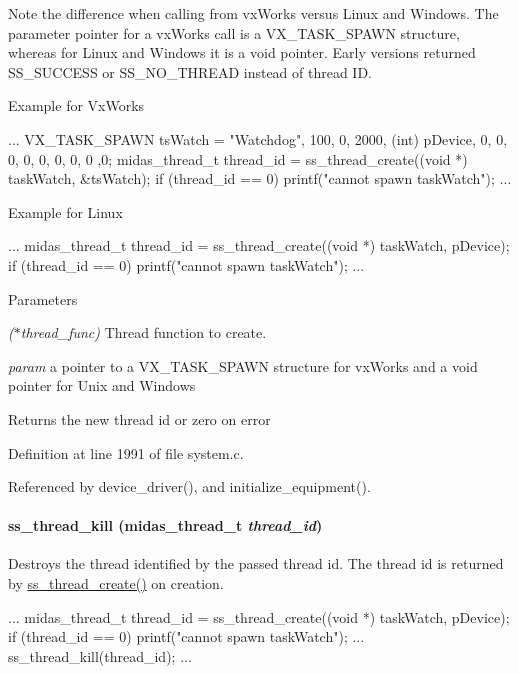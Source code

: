 Note the difference when calling from vxWorks versus Linux and Windows. The parameter pointer for a vxWorks call is a VX\_\-TASK\_\-SPAWN structure, whereas for Linux and Windows it is a void pointer. Early versions returned SS\_\-SUCCESS or SS\_\-NO\_\-THREAD instead of thread ID.

Example for VxWorks 
\begin{DoxyCode}
...
VX_TASK_SPAWN tsWatch = {"Watchdog", 100, 0, 2000,  (int) pDevice, 0, 0, 0, 0, 0,
       0, 0, 0 ,0};
midas_thread_t thread_id = ss_thread_create((void *) taskWatch, &tsWatch);
if (thread_id == 0) {
  printf("cannot spawn taskWatch\n");
}
...
\end{DoxyCode}
 Example for Linux 
\begin{DoxyCode}
...
midas_thread_t thread_id = ss_thread_create((void *) taskWatch, pDevice);
if (thread_id == 0) {
  printf("cannot spawn taskWatch\n");
}
...
\end{DoxyCode}
 
\begin{DoxyParams}{Parameters}
\item[{\em ($\ast$thread\_\-func)}]Thread function to create. \item[{\em param}]a pointer to a VX\_\-TASK\_\-SPAWN structure for vxWorks and a void pointer for Unix and Windows \end{DoxyParams}
\begin{DoxyReturn}{Returns}
the new thread id or zero on error 
\end{DoxyReturn}


Definition at line 1991 of file system.c.

Referenced by device\_\-driver(), and initialize\_\-equipment().
\paragraph[{ss\_\-thread\_\-kill}]{ ss\_\-thread\_\-kill (midas\_\-thread\_\-t {\em thread\_\-id})}\hfill\label{group__msfunctionc_gacf452572de3c2f6c5c899bc4a19aeaac}
Destroys the thread identified by the passed thread id. The thread id is returned by \hyperlink{group__msfunctionc_ga29342b1b9eaa66a0076dd0876090087d}{ss\_\-thread\_\-create()} on creation.


\begin{DoxyCode}
...
midas_thread_t thread_id = ss_thread_create((void *) taskWatch, pDevice);
if (thread_id == 0) {
  printf("cannot spawn taskWatch\n");
}
...
ss_thread_kill(thread_id);
...
\end{DoxyCode}
 
